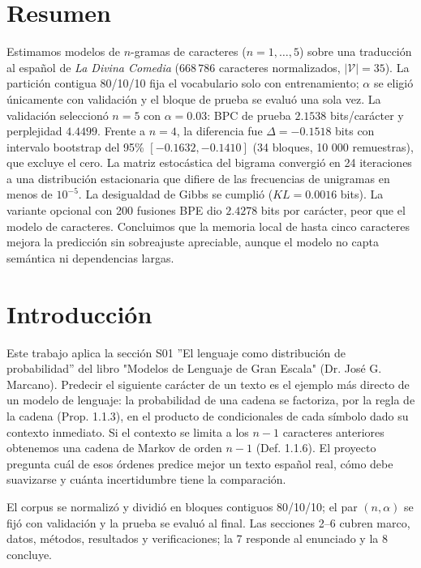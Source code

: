 \documentclass[11pt,letterpaper]{article}
\begin{document}
	\section*{Resumen}
	Estimamos modelos de $n$-gramas de caracteres ($n=1,\dots,5$) sobre una traducción al español de \textit{La Divina Comedia} ($668\,786$ caracteres normalizados, $|\mathcal V|=35$). La partición contigua 80/10/10 fija el vocabulario solo con entrenamiento; $\alpha$ se eligió únicamente con validación y el bloque de prueba se evaluó una sola vez. La validación seleccionó $n=5$ con $\alpha=0.03$: BPC de prueba $2.1538$ bits/carácter y perplejidad $4.4499$. Frente a $n=4$, la diferencia fue $\Delta=-0.1518$ bits con intervalo bootstrap del 95\% $[-0.1632,-0.1410]$ (34 bloques, 10 000 remuestras), que excluye el cero. La matriz estocástica del bigrama convergió en 24 iteraciones a una distribución estacionaria que difiere de las frecuencias de unigramas en menos de $10^{-5}$. La desigualdad de Gibbs se cumplió ($KL=0.0016$ bits). La variante opcional con 200 fusiones BPE dio $2.4278$ bits por carácter, peor que el modelo de caracteres. Concluimos que la memoria local de hasta cinco caracteres mejora la predicción sin sobreajuste apreciable, aunque el modelo no capta semántica ni dependencias largas.
	
	\section{Introducción}
	Este trabajo aplica la sección S01 ''El lenguaje como distribución de probabilidad'' del libro "Modelos de Lenguaje de Gran Escala" (Dr. José G. Marcano). Predecir el siguiente carácter de un texto es el ejemplo más directo de un modelo de lenguaje: la probabilidad de una cadena se factoriza, por la regla de la cadena (Prop. 1.1.3), en el producto de condicionales de cada símbolo dado su contexto inmediato. Si el contexto se limita a los $n-1$ caracteres anteriores obtenemos una cadena de Markov de orden $n-1$ (Def. 1.1.6). El proyecto pregunta cuál de esos órdenes predice mejor un texto español real, cómo debe suavizarse y cuánta incertidumbre tiene la comparación.
	
	El corpus se normalizó y dividió en bloques contiguos 80/10/10; el par $(n,\alpha)$ se fijó con validación y la prueba se evaluó al final. Las secciones 2--6 cubren marco, datos, métodos, resultados y verificaciones; la 7 responde al enunciado y la 8 concluye.
	
\end{document}
